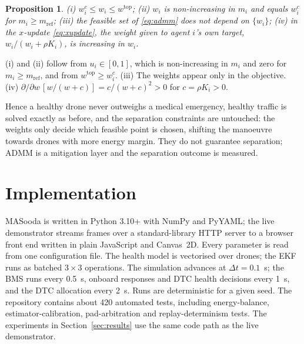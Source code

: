 \documentclass[journal]{IEEEtran}
\newtheorem{proposition}{Proposition}
\begin{document}
\begin{proposition}\label{prop:weights}
(i) $w^{c}_i \le w_i \le w^{\mathrm{top}}$; (ii) $w_i$ is non-increasing in $m_i$ and equals $w^{c}_i$ for $m_i \ge m_{\mathrm{ref}}$; (iii) the feasible set of \eqref{eq:admm} does not depend on $\{w_i\}$; (iv) in the $x$-update \eqref{eq:xupdate}, the weight given to agent $i$'s own target, $w_i/(w_i + \rho K_i)$, is increasing in $w_i$.
\end{proposition}
\begin{IEEEproof}
(i) and (ii) follow from $u_i \in [0,1]$, which is non-increasing in $m_i$ and zero for $m_i \ge m_{\mathrm{ref}}$, and from $w^{\mathrm{top}} \ge w^c_i$. (iii) The weights appear only in the objective. (iv) $\partial/\partial w\,[w/(w + c)] = c/(w + c)^2 > 0$ for $c = \rho K_i > 0$.
\end{IEEEproof}

Hence a healthy drone never outweighs a medical emergency, healthy traffic is solved exactly as before, and the separation constraints are untouched: the weights only decide which feasible point is chosen, shifting the manoeuvre towards drones with more energy margin. They do not guarantee separation; ADMM is a mitigation layer and the separation outcome is measured.

\section{Implementation}\label{sec:impl}
MASooda is written in Python 3.10+ with NumPy and PyYAML; the live demonstrator streams frames over a standard-library HTTP server to a browser front end written in plain JavaScript and Canvas~2D. Every parameter is read from one configuration file. The health model is vectorised over drones; the EKF runs as batched $3\times 3$ operations. The simulation advances at $\Delta t = 0.1$~s; the BMS runs every 0.5~s, onboard responses and DTC health decisions every 1~s, and the DTC allocation every 2~s. Runs are deterministic for a given seed. The repository contains about 420 automated tests, including energy-balance, estimator-calibration, pad-arbitration and replay-determinism tests. The experiments in Section~\ref{sec:results} use the same code path as the live demonstrator.



\end{document}
